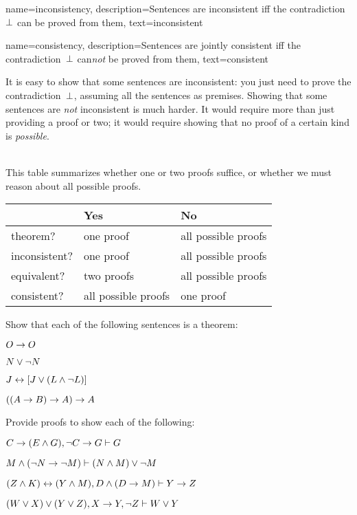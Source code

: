 {    name={inconsistency}, 
  description={Sentences are inconsistent iff the contradiction~$\bot$ can be proved from them},
    text={inconsistent}
}

{    name={consistency}, 
  description={Sentences are jointly consistent iff the contradiction~$\bot$ can\emph{not} be proved from them},
    text={consistent}
}

It is easy to show that some sentences are inconsistent: you just need
to prove the contradiction~$\bot$, assuming all the sentences as
premises. Showing that some sentences are \emph{not} inconsistent is much
harder. It would require more than just providing a proof or two; it
would require showing that no proof of a certain kind is
\emph{possible}.

\
\\
This table summarizes whether one or two proofs suffice, or whether we must reason about all possible proofs.

\begin{center}
\begin{tabular}{l l l}
 & \textbf{Yes} & \textbf{No}\\
 \hline
theorem? & one proof & all possible proofs\\
inconsistent? &  one proof  & all possible proofs\\
equivalent? & two proofs & all possible proofs\\
consistent? & all possible proofs & one proof\\
\end{tabular}
\end{center}


\practiceproblems
\problempart
Show that each of the following sentences is a theorem:
\begin{earg}
\item $O \rightarrow O$
\item $N \vee \neg N$
\item $J \leftrightarrow [J\vee (L\wedge\neg L)]$
\item $((A \rightarrow B) \rightarrow A) \rightarrow A$ 
\end{earg}

\problempart
Provide proofs to show each of the following:
\begin{earg}
\item $C\rightarrow(E\wedge G), \neg C \rightarrow G \vdash G$
\item $M \wedge (\neg N \rightarrow \neg M) \vdash (N \wedge M) \vee \neg M$
\item $(Z\wedge K)\leftrightarrow(Y\wedge M), D\wedge(D\rightarrow M) \vdash Y\rightarrow Z$
\item $(W \vee X) \vee (Y \vee Z), X\rightarrow Y, \neg Z \vdash W\vee Y$
\end{earg}

